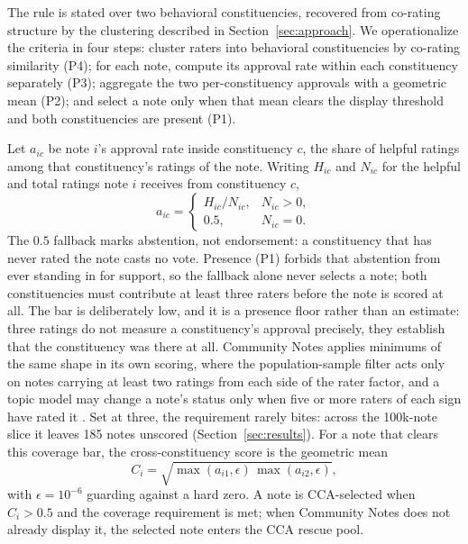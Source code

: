 \documentclass[10pt,twocolumn]{article}
\begin{document}
The rule is stated over two behavioral constituencies, recovered from co-rating
structure by the clustering described in Section~\ref{sec:approach}. We
operationalize the criteria in four steps: cluster raters into behavioral
constituencies by co-rating similarity (P4); for each note, compute its approval
rate within each constituency separately (P3); aggregate the two per-constituency
approvals with a geometric mean (P2); and select a note only when that mean
clears the display threshold and both constituencies are present (P1).

Let $a_{ic}$ be note $i$'s approval rate inside constituency $c$, the share of
helpful ratings among that constituency's ratings of the note. Writing $H_{ic}$
and $N_{ic}$ for the helpful and total ratings note $i$ receives from
constituency $c$,
\begin{equation}
a_{ic} =
\begin{cases}
H_{ic}/N_{ic}, & N_{ic} > 0,\\
0.5, & N_{ic} = 0.
\end{cases}
\end{equation}
The $0.5$ fallback marks abstention, not endorsement: a constituency that has
never rated the note casts no vote. Presence (P1) forbids that abstention from
ever standing in for support, so the fallback alone never selects a note; both
constituencies must contribute at least three raters before the note is scored
at all. The bar is deliberately low, and it is a presence floor rather than an
estimate: three ratings do not measure a constituency's approval precisely, they
establish that the constituency was there at all. Community Notes applies
minimums of the same shape in its own scoring, where the population-sample
filter acts only on notes carrying at least two ratings from each side of the
rater factor, and a topic model may change a note's status only when five or
more raters of each sign have rated it \citep{xcommunitynotes2026ranking}. Set
at three, the requirement rarely bites: across the 100k-note slice it leaves 185
notes unscored (Section~\ref{sec:results}). For a note that clears this coverage
bar, the cross-constituency score is
the geometric mean
\begin{equation}
    C_i = \sqrt{\max(a_{i1},\epsilon)\,\max(a_{i2},\epsilon)},
    \label{eq:cca-score}
\end{equation}
with $\epsilon = 10^{-6}$ guarding against a hard zero. A note is CCA-selected
when $C_i > 0.5$ and the coverage requirement is met; when Community Notes
does not already display it, the selected note enters the CCA rescue pool.
\end{document}
